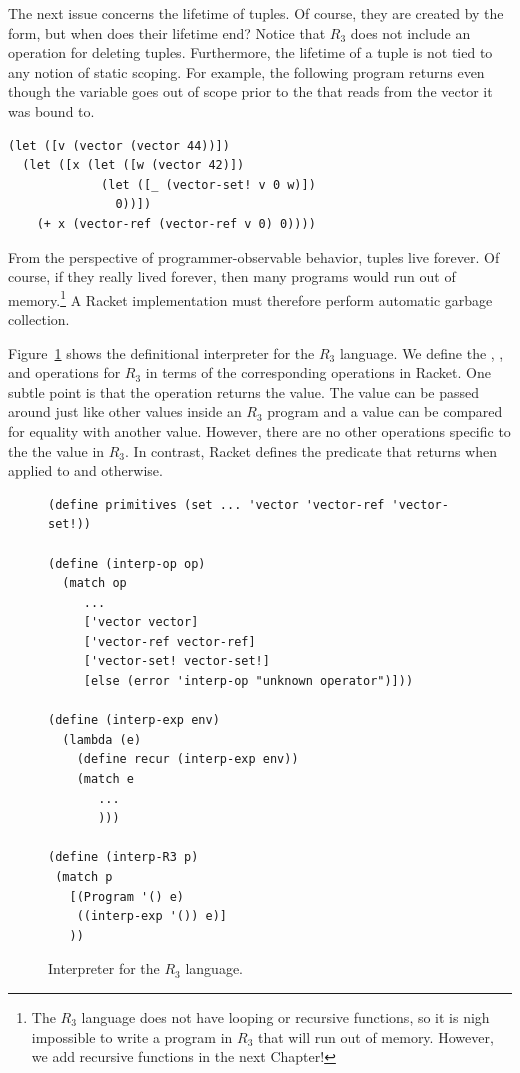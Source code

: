 \documentclass[11pt]{book}
\begin{document}
The next issue concerns the lifetime of tuples. Of course, they are
created by the  form, but when does their lifetime end?
Notice that $R_3$ does not include an operation for deleting
tuples. Furthermore, the lifetime of a tuple is not tied to any notion
of static scoping. For example, the following program returns
 even though the variable  goes out of scope prior to
the  that reads from the vector it was bound to.
\begin{center}
\begin{minipage}{0.96\textwidth}
\begin{lstlisting}
(let ([v (vector (vector 44))])
  (let ([x (let ([w (vector 42)])
             (let ([_ (vector-set! v 0 w)])
               0))])
    (+ x (vector-ref (vector-ref v 0) 0))))
\end{lstlisting}
\end{minipage}
\end{center}

From the perspective of programmer-observable behavior, tuples live
forever. Of course, if they really lived forever, then many programs
would run out of memory.\footnote{The $R_3$ language does not have
  looping or recursive functions, so it is nigh impossible to write a
  program in $R_3$ that will run out of memory. However, we add
  recursive functions in the next Chapter!} A Racket implementation
must therefore perform automatic garbage collection.

Figure~\ref{fig:interp-R3} shows the definitional interpreter for the
$R_3$ language. We define the , , and
 operations for $R_3$ in terms of the corresponding
operations in Racket. One subtle point is that the 
operation returns the  value. The  value
can be passed around just like other values inside an $R_3$ program
and a  value can be compared for equality with another
 value. However, there are no other operations specific
to the the  value in $R_3$. In contrast, Racket defines
the  predicate that returns  when applied to
 and  otherwise.

\begin{figure}[tbp]
\begin{lstlisting}
(define primitives (set ... 'vector 'vector-ref 'vector-set!))

(define (interp-op op)
  (match op
     ...
     ['vector vector]
     ['vector-ref vector-ref]
     ['vector-set! vector-set!]
     [else (error 'interp-op "unknown operator")]))

(define (interp-exp env)
  (lambda (e)
    (define recur (interp-exp env))
    (match e
       ...
       )))

(define (interp-R3 p)
 (match p
   [(Program '() e)
    ((interp-exp '()) e)]
   ))
\end{lstlisting}
\caption{Interpreter for the $R_3$ language.}
\label{fig:interp-R3}
\end{figure}
\end{document}
